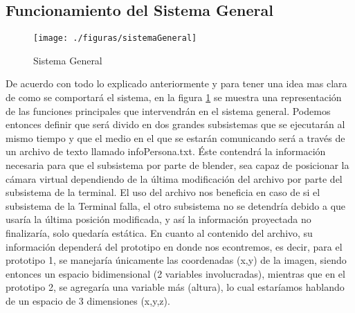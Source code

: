 \documentclass[a4paper,openright,12pt]{report}
\begin{document}
\subsection{Funcionamiento del Sistema General}
\begin{figure}[th]
	\centering
	\texttt{[image: ./figuras/sistemaGeneral]}
	\caption{Sistema General} \label{fig:sistemaGeneral}
\end{figure}
De acuerdo con todo lo explicado anteriormente y para tener una idea mas clara de como se comportará el sistema, en la figura \ref{fig:sistemaGeneral} se muestra una representación de las funciones principales que intervendrán en el sistema general. Podemos entonces definir que será divido en dos grandes subsistemas que se ejecutarán al mismo tiempo y que el medio en el que se estarán comunicando será a través de un archivo de texto llamado infoPersona.txt. Éste contendrá la información necesaria para que el subsistema por parte de blender, sea capaz de posicionar la cámara virtual dependiendo de la última modificación del archivo por parte del subsistema de la terminal. El uso del archivo nos beneficia en caso de si el subsistema de la Terminal falla, el otro subsistema no se detendría debido a que usaría la última posición modificada, y así la información proyectada no finalizaría, solo quedaría estática. En cuanto al contenido del archivo, su información dependerá del prototipo en donde nos econtremos, es decir, para el prototipo 1, se manejaría únicamente las coordenadas (x,y) de la imagen, siendo entonces un espacio bidimensional (2 variables involucradas), mientras que en el prototipo 2, se agregaría una variable más (altura), lo cual estaríamos hablando de un espacio de 3 dimensiones (x,y,z).

\end{document}
